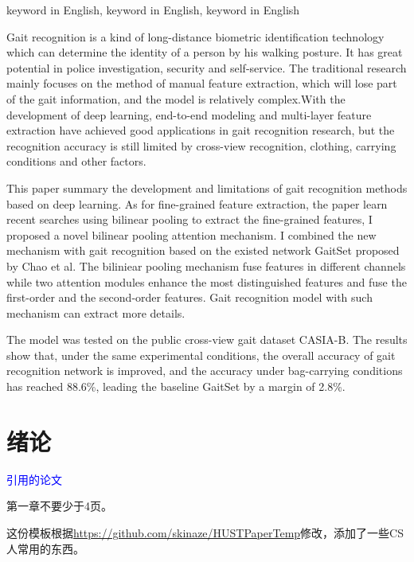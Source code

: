\documentclass[supercite]{HustGraduPaper}
\theoremstyle{definition}
\begin{document}
\begin{enabstract}{keyword in English, keyword in English, keyword in English}

Gait recognition is a kind of long-distance biometric identification technology which can determine the identity of a person by his walking posture. It has great potential in police investigation, security and self-service. The traditional research mainly focuses on the method of manual feature extraction, which will lose part of the gait information, and the model is relatively complex.With the development of deep learning, end-to-end modeling and multi-layer feature extraction have achieved good applications in gait recognition research, but the recognition accuracy is still limited by cross-view recognition, clothing, carrying conditions and other factors.

This paper summary the development and limitations of gait recognition methods based on deep learning. As for fine-grained feature extraction, the paper learn recent searches using bilinear pooling to extract the fine-grained features, I proposed a novel bilinear pooling attention mechanism. I combined the new mechanism with gait recognition based on the existed network GaitSet proposed by Chao et al. The biliniear pooling mechanism fuse features in different channels while two attention modules enhance the most distinguished features and fuse the first-order and the second-order features. Gait recognition model with such mechanism can extract more details.

The model was tested on the public cross-view gait dataset CASIA-B. The results show that, under the same experimental conditions, the overall accuracy of gait recognition network is improved, and the accuracy under bag-carrying conditions has reached 88.6\%, leading the baseline GaitSet by a margin of 2.8\%.


\end{enabstract}

\tableofcontents[level=2]
\clearpage


\section{绪论}
\textcolor{blue}{引用的论文\cite{wenxian}}

第一章不要少于4页。

这份模板根据\url{https://github.com/skinaze/HUSTPaperTemp}\cite{ski17}修改，添加了一些CS人常用的东西\cite{baf96}。
\end{document}

